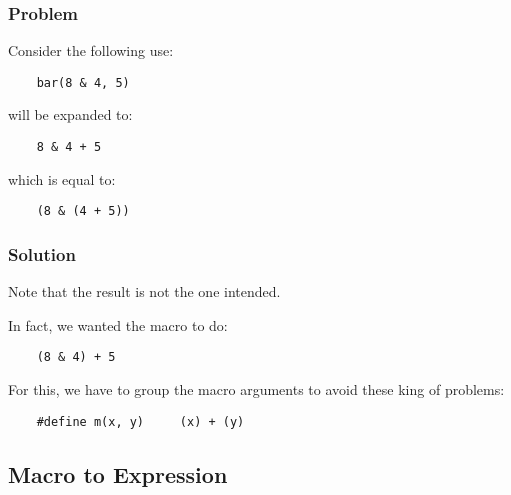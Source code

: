 \documentclass[9pt]{beamer}
\newcommand{\nl}[0]{\vspace{0.4cm}}
\begin{document}

\begin{frame}[containsverbatim]
  \frametitle{Problem}

  Consider the following use:

  \begin{verbatim}
    bar(8 & 4, 5)
  \end{verbatim}

  will be expanded to:

  \begin{verbatim}
    8 & 4 + 5
  \end{verbatim}

  which is equal to:

  \begin{verbatim}
    (8 & (4 + 5))
  \end{verbatim}
\end{frame}


\begin{frame}[containsverbatim]
  \frametitle{Solution}

  Note that the result is not the one intended.

  \nl

  In fact, we wanted the macro to do:

  \begin{verbatim}
    (8 & 4) + 5
  \end{verbatim}

  For this, we have to group the macro arguments to avoid these king of
  problems:

  \begin{verbatim}
    #define m(x, y)     (x) + (y)
  \end{verbatim}
\end{frame}

%
%

\subsection{Macro to Expression}

\end{document}
